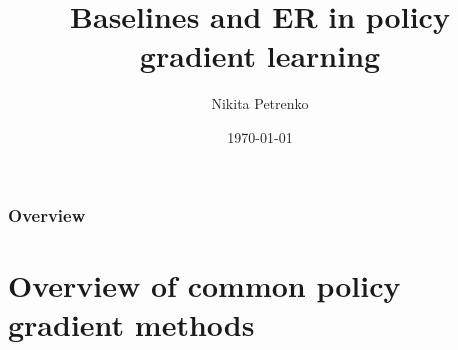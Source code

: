 \documentclass{beamer}
\title[Short title]{Baselines and ER in policy gradient learning} %
\author{Nikita Petrenko} %
\date{\today} %
\begin{document}
\begin{frame}
\titlepage %
\end{frame}

\begin{frame}
\frametitle{Overview} %
\tableofcontents %
\end{frame}


\section{Overview of common policy gradient methods} %
\end{document}
